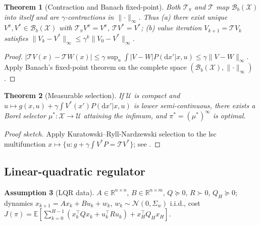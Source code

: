 \documentclass[11pt,letterpaper]{article}
\theoremstyle{plain}
\newtheorem{theorem}{Theorem}[section]
\theoremstyle{definition}
\newtheorem{assumption}[theorem]{Assumption}
\theoremstyle{remark}
\newcommand{\R}{\mathbb{R}}
\newcommand{\E}{\mathbb{E}}
\newcommand{\dd}{\mathrm{d}}
\newcommand{\calB}{\mathcal{B}}
\newcommand{\calN}{\mathcal{N}}
\newcommand{\calT}{\mathcal{T}}
\newcommand{\calU}{\mathcal{U}}
\newcommand{\calX}{\mathcal{X}}
\newcommand{\norm}[1]{\lVert #1\rVert}
\begin{document}
\begin{theorem}[Contraction and Banach fixed-point]\label{thm:bellman-app}
Both $\calT_\pi$ and $\calT$ map $\calB_b(\calX)$ into itself and are
$\gamma$-contractions in $\norm{\cdot}_\infty$. Thus (a) there exist unique
$V^\pi,V^*\in\calB_b(\calX)$ with $\calT_\pi V^\pi=V^\pi$, $\calT V^*=V^*$;
(b) value iteration $V_{k+1}=\calT V_k$ satisfies
$\norm{V_k-V^*}_\infty\le\gamma^k\norm{V_0-V^*}_\infty$.
\end{theorem}
\begin{proof}
$|\calT V(x)-\calT W(x)|\le\gamma\sup_u\int|V-W|P(\dd x'|x,u)\le\gamma\norm{V-W}_\infty$.
Apply Banach's fixed-point theorem on the complete space
$(\calB_b(\calX),\norm{\cdot}_\infty)$.
\end{proof}

\begin{theorem}[Measurable selection]\label{thm:meas-sel}
If $\calU$ is compact and $u\mapsto g(x,u)+\gamma\int V^*(x')P(\dd x'|x,u)$
is lower semi-continuous, there exists a Borel selector $\mu^*:\calX\to\calU$
attaining the infimum, and $\pi^*=(\mu^*)^\infty$ is optimal.
\end{theorem}
\begin{proof}[Proof sketch]
Apply Kuratowski--Ryll-Nardzewski selection to the lsc multifunction
$x\mapsto\{u:g+\gamma\int V^*P=\calT V^*\}$;
see \citep[Appx.~D]{bertsekas1996ndp}.
\end{proof}

\subsection{Linear-quadratic regulator}\label{app:lqr}

\begin{assumption}[LQR data]\label{as:lqr}
$A\in\R^{n\times n}$, $B\in\R^{n\times m}$, $Q\succeq 0$, $R\succ 0$,
$Q_H\succeq 0$; dynamics $x_{k+1}=Ax_k+Bu_k+w_k$, $w_k\sim\calN(0,\Sigma_w)$
i.i.d., cost
$J(\pi)=\E[\sum_{k=0}^{H-1}(x_k^\top Q x_k+u_k^\top R u_k)+x_H^\top Q_H x_H]$.
\end{assumption}
\end{document}

